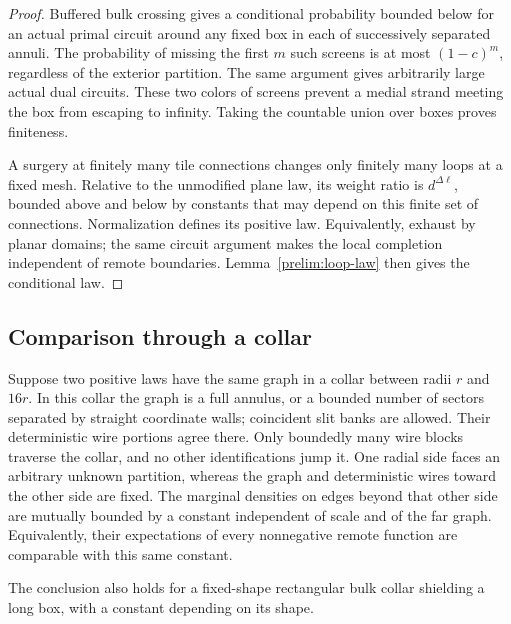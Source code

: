 \begin{proof}
Buffered bulk crossing gives a conditional probability bounded below for
an actual primal circuit around any fixed box in each of successively
separated annuli. The probability of missing the first $m$ such screens
is at most $(1-c)^m$, regardless of the exterior partition. The same
argument gives arbitrarily large actual dual circuits. These two colors
of screens prevent a medial strand meeting the box from escaping to
infinity. Taking the countable union over boxes proves finiteness.

A surgery at finitely many tile connections changes only finitely many
loops at a fixed mesh. Relative to the unmodified plane law, its weight
ratio is $d^{\Delta\ell}$, bounded above and below by constants that may
depend on this finite set of connections. Normalization defines its
positive law. Equivalently, exhaust by planar domains; the same circuit
argument makes the local completion independent of remote boundaries.
Lemma~\ref{prelim:loop-law} then gives the conditional law.
\end{proof}

\subsection{Comparison through a collar}

\begin{lemma}\label{prelim:collar}
Suppose two positive laws have the same graph in a collar between radii
$r$ and $16r$. In this collar the graph is a full annulus, or a bounded
number of sectors separated by straight coordinate walls; coincident slit
banks are allowed. Their deterministic wire portions agree there. Only
boundedly many wire blocks traverse the collar, and no other
identifications jump it. One radial side faces an arbitrary unknown
partition, whereas the graph and deterministic wires toward the other
side are fixed. The marginal densities on edges beyond that other side
are mutually bounded by a constant independent of scale and of the far
graph. Equivalently, their expectations of every nonnegative remote
function are comparable with this same constant.

The conclusion also holds for a fixed-shape rectangular bulk collar
shielding a long box, with a constant depending on its shape.
\end{lemma}

